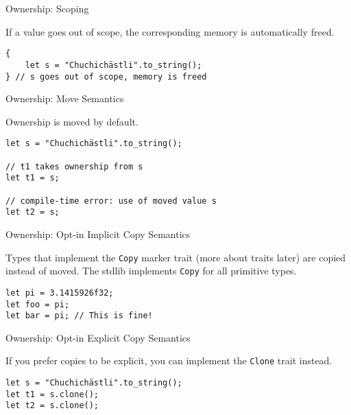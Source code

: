
\begin{frame}[fragile]{Ownership: Scoping}

If a value goes out of scope, the corresponding memory is automatically freed.

\begin{verbatim}
{
    let s = "Chuchichästli".to_string();
} // s goes out of scope, memory is freed
\end{verbatim}

\end{frame}


\begin{frame}[fragile]{Ownership: Move Semantics}

Ownership is moved by default.

\begin{verbatim}
let s = "Chuchichästli".to_string();

// t1 takes ownership from s
let t1 = s;

// compile-time error: use of moved value s
let t2 = s;
\end{verbatim}

\end{frame}


\begin{frame}[fragile]{Ownership: Opt-in Implicit Copy Semantics}

Types that implement the \texttt{Copy} marker trait (more about traits later)
are copied instead of moved. The stdlib implements \texttt{Copy} for all
primitive types.

\begin{verbatim}
let pi = 3.1415926f32;
let foo = pi;
let bar = pi; // This is fine!
\end{verbatim}

\end{frame}


\begin{frame}[fragile]{Ownership: Opt-in Explicit Copy Semantics}

If you prefer copies to be explicit, you can implement the \texttt{Clone} trait
instead.

\begin{verbatim}
let s = "Chuchichästli".to_string();
let t1 = s.clone();
let t2 = s.clone();
\end{verbatim}

\end{frame}

